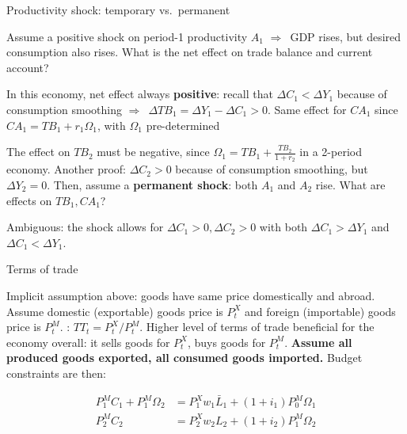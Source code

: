 \documentclass{beamer}
\newcommand{\tb}[1]{{\color{blue}{\textbf{#1}}}}
\newenvironment{mytemize}
{\vfill\itemize[nolistsep,itemsep=\fill,label=\color{blue}{$\triangleright$}]}
  {\enditemize}
\newcommand{\rarr}{$\Rightarrow$\ }
\begin{document}
\begin{frame}{%
\protect\hypertarget{productivity-shock-transitory-vs.permanent}{%
Productivity shock: temporary vs.~permanent}}

Assume a positive shock on period-1 productivity \(A_1\) \rarr GDP
rises, but desired consumption also rises. What is the net effect on
trade balance and current account?

\begin{mytemize}

\item
  In this economy, net effect always \textbf{positive}: recall that
  \(\Delta C_1 < \Delta Y_1\) because of consumption smoothing
  \rarr \(\Delta TB_1 = \Delta Y_1 - \Delta C_1 > 0\). Same effect for
  \(CA_1\) since \(CA_1 = TB_1 + r_1 \Omega_1\), with \(\Omega_1\)
  pre-determined
\item
  The effect on \(TB_2\) must be negative, since
  \(\Omega_1 = TB_1 + \frac{TB_2}{1+r_2}\) in a 2-period economy.
  Another proof: \(\Delta C_2 > 0\) because of consumption smoothing,
  but \(\Delta Y_2 = 0\).
\end{mytemize}
\vfill
Then, assume a \textbf{permanent shock}: both \(A_1\) and \(A_2\) rise.
What are effects on \(TB_1, CA_1\)?

\begin{mytemize}

\item
  Ambiguous: the shock allows for \(\Delta C_1 > 0, \Delta C_2 > 0\)
  with both \(\Delta C_1> \Delta Y_1\) and \(\Delta C_1< \Delta Y_1\).
\end{mytemize}

\end{frame}

\begin{frame}{%
\protect\hypertarget{terms-of-trade}{%
Terms of trade}}

Implicit assumption above: goods have same price
domestically and abroad. Assume domestic (exportable) goods price is \(P^X_t\)
 and foreign (importable) goods price is
\(P^M_t\).
\vfill
\tb{Terms of trade}:  \(TT_t = P^X_t/P^M_t\). Higher level
of terms of trade beneficial for the economy overall: it sells goods for
\(P^X_t\), buys goods for \(P^M_t\). \vfill \textbf{Assume all produced
goods exported, all consumed goods imported.} Budget constraints are
then:

\begin{align*}
     P^M_1 C_1 + P_1^M \Omega_2  &= P^X_1 w_1 \bar L_1 + (1+i_1) P_0^M \Omega_1  \\
     P^M_2 C_2 & =  P^X_2 w_2 L_2  + (1+i_2) P_1^M \Omega_2
  \end{align*} 
\end{frame}
\end{document}
